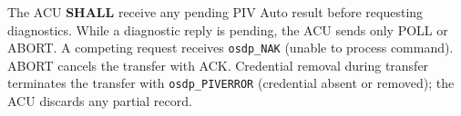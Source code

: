 The ACU \textbf{SHALL} receive any pending PIV Auto result before requesting
diagnostics. While a diagnostic reply is pending, the ACU sends only POLL
or ABORT. A competing request receives \texttt{osdp\_NAK} 
(unable to process command). ABORT cancels the transfer with ACK. Credential
removal during transfer terminates the transfer with \texttt{osdp\_PIVERROR}
 (credential absent or removed); the ACU discards any partial record.
